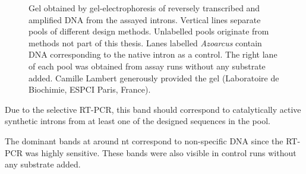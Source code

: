 \documentclass[../../master.tex]{subfiles}
\begin{document}
\begin{figure}[!ht]
	\centering
	\caption[Gel of a Splicing Assay]{Gel obtained by gel-electrophoresis of reversely transcribed and amplified DNA from the assayed introns.
		Vertical lines separate pools of different design methods. 
		Unlabelled pools originate from methods not part of this thesis.
		Lanes labelled \textit{Azoarcus} contain DNA corresponding to the native intron as a control.
		The right lane of each pool was obtained from assay runs without any substrate added.
		Camille Lambert generously provided the gel (Laboratoire de Biochimie, ESPCI Paris, France).
	}\label{fig:gel_proto}
\end{figure}

Due to the selective RT-PCR, this band should correspond to catalytically active synthetic introns from at least one of the designed sequences in the pool.

The dominant bands at around \unit[50]{nt} correspond to non-specific DNA since the RT-PCR was highly sensitive.
These bands were also visible in control runs without any substrate added.
\end{document}
